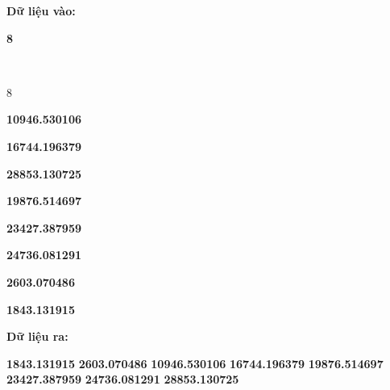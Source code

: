 \textbf{Dữ liệu vào:}

\textbf{}\textbf{8}

\textbf{}

 

8 

\textbf{10946.530106 }

\textbf{16744.196379 }

\textbf{28853.130725 }

\textbf{19876.514697 }

\textbf{23427.387959 }

\textbf{24736.081291 }

\textbf{2603.070486 }

\textbf{1843.131915}\textbf{
}

\textbf{Dữ liệu ra:}

\textbf{
}\textbf{\textbf{1843.131915
}}\textbf{\textbf{2603.070486
}}\textbf{\textbf{10946.530106
}}\textbf{\textbf{16744.196379
}}\textbf{\textbf{19876.514697
}}\textbf{\textbf{23427.387959
}}\textbf{\textbf{24736.081291
}}\textbf{\textbf{28853.130725}}\textbf{
}